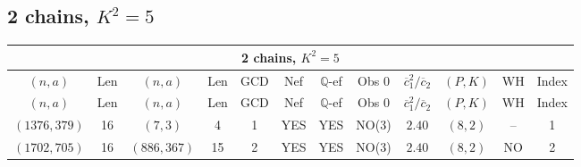 \subsection{2 chains, $K^2 = 5$}
\begin{longtable}{|c|c|c|c|c|c|c|c|c|c|c|c|}
\hline
\multicolumn{12}{|c|}{2 chains, $K^2 = 5$}\\
\hline
$(n,a)$ & Len & $(n,a)$ & Len & GCD & Nef & $\mathbb Q$-ef & Obs 0 & $\overline c_1^2 / \overline c_2$ & $(P,K)$ & WH & Index\\
\hline
\endfirsthead

\hline
$(n,a)$ & Len & $(n,a)$ & Len & GCD & Nef & $\mathbb Q$-ef & Obs 0 & $\overline c_1^2 / \overline c_2$ & $(P,K)$ & WH & Index\\
\hline
\endhead
\hline
\endfoot

$(1376,379)$ & 16 & $(7,3)$ & 4 & 1 & YES & YES & NO(3) & $2.40$ & $(8,2)$ & -- & 1\\
$(1702,705)$ & 16 & $(886,367)$ & 15 & 2 & YES & YES & NO(3) & $2.40$ & $(8,2)$ & NO & 2
\end{longtable}
